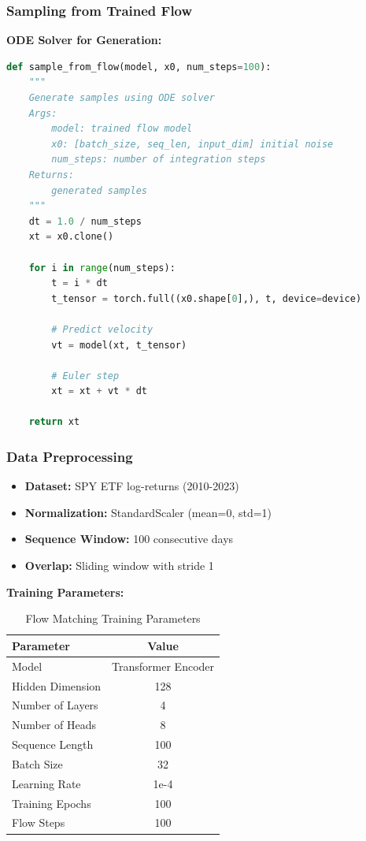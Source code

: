 \documentclass[a4paper,12pt]{article}
\begin{document}
\subsubsection{Sampling from Trained Flow}

\textbf{ODE Solver for Generation:}
\begin{lstlisting}[language=Python]
def sample_from_flow(model, x0, num_steps=100):
    """
    Generate samples using ODE solver
    Args:
        model: trained flow model
        x0: [batch_size, seq_len, input_dim] initial noise
        num_steps: number of integration steps
    Returns:
        generated samples
    """
    dt = 1.0 / num_steps
    xt = x0.clone()
    
    for i in range(num_steps):
        t = i * dt
        t_tensor = torch.full((x0.shape[0],), t, device=device)
        
        # Predict velocity
        vt = model(xt, t_tensor)
        
        # Euler step
        xt = xt + vt * dt
    
    return xt
\end{lstlisting}

\subsubsection{Data Preprocessing}
\begin{itemize}
    \item \textbf{Dataset:} SPY ETF log-returns (2010-2023)
    \item \textbf{Normalization:} StandardScaler (mean=0, std=1)
    \item \textbf{Sequence Window:} 100 consecutive days
    \item \textbf{Overlap:} Sliding window with stride 1
\end{itemize}

\textbf{Training Parameters:}
\begin{table}[H]
    \centering
    \begin{tabular}{lc}
        \toprule
        \textbf{Parameter} & \textbf{Value} \\
        \midrule
        Model & Transformer Encoder \\
        Hidden Dimension & 128 \\
        Number of Layers & 4 \\
        Number of Heads & 8 \\
        Sequence Length & 100 \\
        Batch Size & 32 \\
        Learning Rate & 1e-4 \\
        Training Epochs & 100 \\
        Flow Steps & 100 \\
        \bottomrule
    \end{tabular}
    \caption{Flow Matching Training Parameters}
\end{table}
\end{document}
